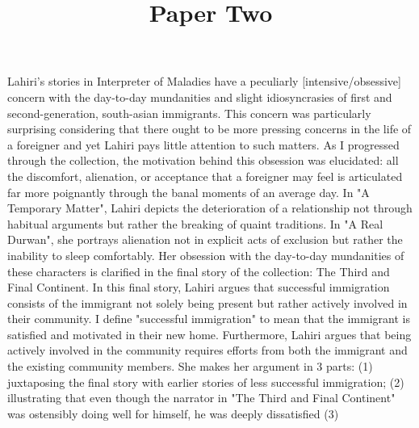 \documentclass[12pt]{article}
\title{Paper Two}
\date{}
\begin{document}
\maketitle
\doublespacing

\thispagestyle{firststyle}

%       
%
Lahiri's stories in Interpreter of Maladies have a peculiarly [intensive/obsessive] concern with the day-to-day mundanities and slight idiosyncrasies of first and second-generation, south-asian immigrants. This concern was particularly surprising considering that there ought to be more pressing concerns in the life of a foreigner and yet Lahiri pays little attention to such matters.
As I progressed through the collection, the motivation behind this obsession was elucidated: all the discomfort, alienation, or acceptance that a foreigner may feel is articulated far more poignantly through the banal moments of an average day. 
In "A Temporary Matter", Lahiri depicts the deterioration of a relationship not through habitual arguments but rather the breaking of quaint traditions. In "A Real Durwan", she portrays alienation not in explicit acts of exclusion but rather the inability to sleep comfortably. Her obsession with the day-to-day mundanities of these characters is clarified in the final story of the collection: The Third and Final Continent. 
In this final story, Lahiri argues that successful immigration consists of the immigrant not solely being present but rather actively involved in their
community. I define "successful immigration" to mean that the immigrant is satisfied and motivated in their new home. Furthermore, Lahiri argues that being actively involved in the community requires efforts from both the immigrant and the
existing community members. She makes her argument in 3 parts: (1) juxtaposing the final story with earlier stories of 
less successful immigration; (2) illustrating that even though the narrator in "The Third and Final Continent" was ostensibly 
doing well for himself, he was deeply dissatisfied (3)  \\


\end{document}
